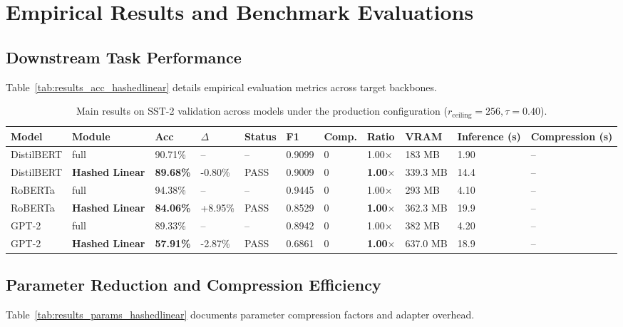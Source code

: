 \section{Empirical Results and Benchmark Evaluations}

\subsection{Downstream Task Performance}
Table~\ref{tab:results_acc_hashedlinear} details empirical evaluation metrics across target backbones.

\begin{table}[t]
\centering
\small
\begin{tabular}{lllllllllll}
\toprule
\textbf{Model} & \textbf{Module} & \textbf{Acc} & \textbf{$\Delta$} & \textbf{Status} & \textbf{F1} & \textbf{Comp.} & \textbf{Ratio} & \textbf{VRAM} & \textbf{Inference (s)} & \textbf{Compression (s)} \\
\midrule
DistilBERT & full & 90.71\% & -- & -- & 0.9099 & 0 & 1.00$\times$ & 183 MB & 1.90 & -- \\
DistilBERT & \textbf{Hashed Linear} & \textbf{89.68\%} & -0.80\% & PASS & 0.9009 & 0 & \textbf{1.00$\times$} & 339.3 MB & 14.4 & -- \\
RoBERTa & full & 94.38\% & -- & -- & 0.9445 & 0 & 1.00$\times$ & 293 MB & 4.10 & -- \\
RoBERTa & \textbf{Hashed Linear} & \textbf{84.06\%} & +8.95\% & PASS & 0.8529 & 0 & \textbf{1.00$\times$} & 362.3 MB & 19.9 & -- \\
GPT-2 & full & 89.33\% & -- & -- & 0.8942 & 0 & 1.00$\times$ & 382 MB & 4.20 & -- \\
GPT-2 & \textbf{Hashed Linear} & \textbf{57.91\%} & -2.87\% & PASS & 0.6861 & 0 & \textbf{1.00$\times$} & 637.0 MB & 18.9 & -- \\
\bottomrule
\end{tabular}
\caption{Main results on SST-2 validation across models under the production configuration ($r_{\mathrm{ceiling}}=256, \tau=0.40$).}
\label{tab:main_sst2}
\end{table}

\subsection{Parameter Reduction and Compression Efficiency}
Table~\ref{tab:results_params_hashedlinear} documents parameter compression factors and adapter overhead.


